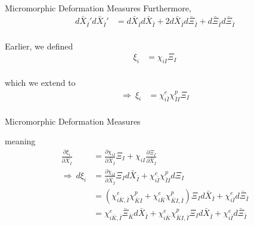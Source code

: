\documentclass[11pt]{beamer}
\begin{document}
\begin{frame}{Micromorphic Deformation Measures}
Furthermore,
\begin{align*}
d\bar{X}_{\bar{I}}' d\bar{X}_{\bar{I}}' &= d\bar{X}_{\bar{I}} d\bar{X}_{\bar{I}} + 2d\bar{X}_{\bar{I}} d\bar{\Xi}_{\bar{I}} + d\bar{\Xi}_{\bar{I}} d\bar{\Xi}_{\bar{I}}\\
\end{align*}

Earlier, we defined
\begin{align*}
\xi_i &= \chi_{iI}\Xi_I\\
\end{align*}

which we extend to
\begin{align*}
\Rightarrow\ \xi_i &= \chi_{i\bar{I}}^e\chi_{\bar{I}I}^p \Xi_I\\
\end{align*}

\end{frame}

\begin{frame}{Micromorphic Deformation Measures}

meaning
\begin{align*}
\frac{\partial \xi_i}{\partial \bar{X}_{\bar{I}}} &= \frac{\partial \chi_{iI}}{\partial \bar{X}_{\bar{I}}} \Xi_I + \chi_{iI} \frac{\partial \Xi_I}{\partial \bar{X}_{\bar{I}}}\\
\Rightarrow\ d \xi_i &= \frac{\partial \chi_{iI}}{\partial \bar{X}_{\bar{I}}} \Xi_I d \bar{X}_{\bar{I}} + \chi_{i\bar{I}}^e \chi_{\bar{I}I}^p d\Xi_{I} \\
&= \left(\chi_{i\bar{K},\bar{I}}^e\chi_{\bar{K}I}^p + \chi_{i\bar{K}}^e\chi_{\bar{K}I,\bar{I}}^p \right)\Xi_I d\bar{X}_{\bar{I}} + \chi_{i\bar{I}}^e d\bar{\Xi}_{\bar{I}}\\
&= \chi_{i\bar{K},\bar{I}}^e\bar{\Xi}_{\bar{K}}d\bar{X}_{\bar{I}} + \chi_{i\bar{K}}^e\chi_{\bar{K}I,\bar{I}}^p \Xi_I d\bar{X}_{\bar{I}} + \chi_{i\bar{I}}^e d\bar{\Xi}_{\bar{I}}\\
\end{align*}

\end{frame}
\end{document}
